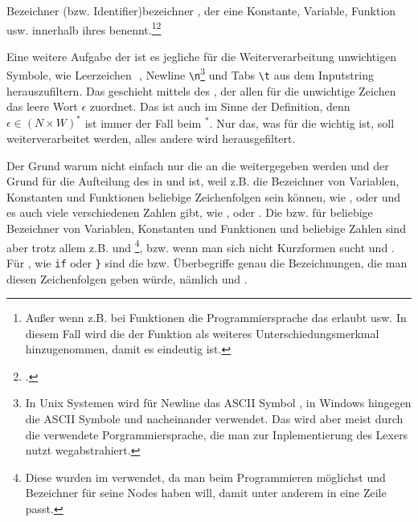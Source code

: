 \begin{Definition}{Bezeichner (bzw. Identifier)}{bezeichner}
  , der eine Konstante, Variable, Funktion usw. innerhalb ihres   benennt.\footnote{Außer wenn z.B. bei Funktionen die Programmiersprache das  erlaubt usw. In diesem Fall wird die  der Funktion als weiteres Unterschiedungsmerkmal hinzugenommen, damit es eindeutig ist.}\footcite{thiemann_einfuhrung_2018}
\end{Definition}

Eine weitere Aufgabe der  ist es jegliche für die Weiterverarbeitung unwichtigen Symbole, wie Leerzeichen \,\textvisiblespace\,, Newline \verb|\n|\footnote{In Unix Systemen wird für Newline das ASCII Symbol , in Windows hingegen die ASCII Symbole  und  nacheinander verwendet. Das wird aber meist durch die verwendete Porgrammiersprache, die man zur Inplementierung des Lexers nutzt wegabstrahiert.} und Tabs \verb|\t| aus dem Inputstring herauszufiltern. Das geschieht mittels des , der allen für die  unwichtige Zeichen das leere Wort $\epsilon$ zuordnet. Das ist auch im Sinne der Definition, denn $\epsilon \in (N\times W)^{*}$ ist immer der Fall beim  $^{*}$. Nur das, was für die  wichtig ist, soll weiterverarbeitet werden, alles andere wird herausgefiltert.

Der Grund warum nicht einfach nur die  an die  weitergegeben werden und der Grund für die Aufteilung des  in  und  ist, weil z.B. die Bezeichner von Variablen, Konstanten und Funktionen beliebige Zeichenfolgen sein können, wie ,  oder  und es auch viele verschiedenen Zahlen gibt, wie ,  oder . Die  bzw.  für beliebige Bezeichner von Variablen, Konstanten und Funktionen und beliebige Zahlen sind aber trotz allem z.B.  und \footnote{Diese  wurden im   verwendet, da man beim Programmieren möglichst  und  Bezeichner für seine Nodes haben will, damit unter anderem  in eine Zeile passt.}, bzw. wenn man sich nicht Kurzformen sucht  und . Für , wie \verb|if| oder \verb|}| sind die  bzw. Überbegriffe genau die Bezeichnungen, die man diesen Zeichenfolgen geben würde, nämlich  und .

